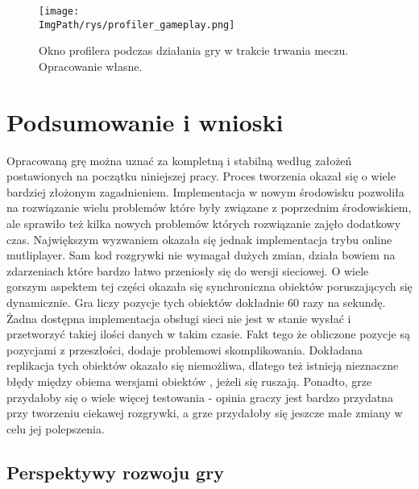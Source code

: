 \documentclass[a4paper,12pt,twoside,openany]{report}
\newcommand{\ImgPath}{.}
\begin{document}
\begin{figure}[H]
	\begin{center}
\centering
\texttt{[image: \\ImgPath/rys/profiler\_gameplay.png]}
\end{center}
	\caption{Okno profilera podczas działania gry w trakcie trwania meczu. Opracowanie własne.}
	\label{profiler_gameplay}
\end{figure}

\chapter{Podsumowanie i wnioski }
Opracowaną grę można uznać za kompletną i stabilną według założeń postawionych na początku niniejszej pracy. Proces tworzenia okazał się o wiele bardziej złożonym zagadnieniem. Implementacja w nowym środowisku pozwoliła na rozwiązanie wielu problemów które były związane z poprzednim środowiskiem, ale sprawiło też kilka nowych problemów których rozwiązanie zajęło dodatkowy czas. Największym wyzwaniem okazała się jednak implementacja trybu online mutliplayer. Sam kod rozgrywki nie wymagał dużych zmian, działa bowiem na zdarzeniach które bardzo łatwo przeniosły się do wersji sieciowej. O wiele gorszym aspektem tej części okazała się synchroniczna obiektów poruszających się dynamicznie. Gra liczy pozycje tych obiektów dokładnie 60 razy na sekundę. Żadna dostępna implementacja obsługi sieci nie jest w stanie wysłać i przetworzyć takiej ilości danych w takim czasie. Fakt tego że obliczone pozycje są pozycjami z przeszłości, dodaje problemowi skomplikowania. Dokładana replikacja tych obiektów okazało się niemożliwa, dlatego też istnieją nieznaczne błędy między obiema wersjami obiektów , jeżeli się ruszają. Ponadto, grze przydałoby się o wiele więcej testowania - opinia graczy jest bardzo przydatna przy tworzeniu ciekawej rozgrywki, a grze przydałoby się jeszcze małe zmiany w celu jej polepszenia.

\section{Perspektywy rozwoju gry}
\end{document}
